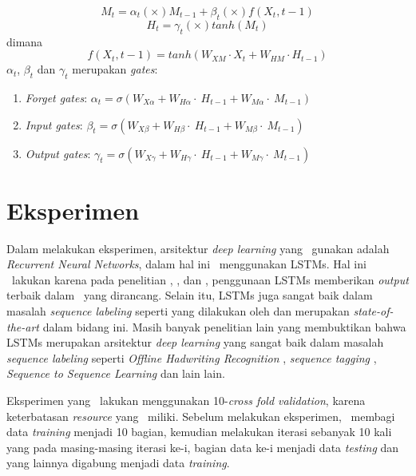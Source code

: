 \begin{enumerate}
	\begin{equation}\label{eq:mt3}
	M_{t}=\alpha_{t} (\times) M_{t-1} + \beta_{t} (\times) f(X_{t},{t-1})
	\end{equation}
	\begin{equation}\label{eq:ht3}
	H_{t}=\gamma_{t} (\times) tanh(M_{t})
	\end{equation}
	dimana
	\begin{equation}\label{eq:hf3}
	f(X_{t},{t-1})=tanh(W_{XM} \cdot X_{t} + W_{HM} \cdot H_{t-1})
	\end{equation}
	$ \alpha_{t} $, $ \beta_{t} $ dan $ \gamma_{t} $ merupakan \textit{gates}:
	\begin{enumerate}
	\item \textit{Forget gates}: $ \alpha_{t}=\sigma(W_{X\alpha}+W_{H\alpha}\cdot~H_{t-1}+W_{M\alpha}\cdot~M_{t-1}) $
	\item \textit{Input gates}: $ \beta_{t}=\sigma(W_{X\beta}+W_{H\beta}\cdot~H_{t-1}+W_{M\beta}\cdot~M_{t-1}) $
	\item \textit{Output gates}: $ \gamma_{t}=\sigma(W_{X\gamma}+W_{H\gamma}\cdot~H_{t-1}+W_{M\gamma}\cdot~M_{t-1}) $
	\end{enumerate}
		
\end{enumerate}
	
\section{Eksperimen}
Dalam melakukan eksperimen, arsitektur \textit{deep learning} yang \saya~gunakan adalah \textit{Recurrent Neural Networks}, dalam hal ini \saya~menggunakan LSTMs. Hal ini \saya~lakukan karena pada penelitian \cite{mujiono2016new}, \cite{jagannatha2016bidirectional}, \cite{limsopatham2016learning} dan \cite{almgren2016named}, penggunaan LSTMs memberikan \textit{output} terbaik dalam \mer~yang dirancang. Selain itu, LSTMs juga sangat baik dalam masalah \textit{sequence labeling} seperti yang dilakukan oleh \cite{graves2013speech} dan merupakan \textit{state-of-the-art} dalam bidang ini. Masih banyak penelitian lain yang membuktikan bahwa LSTMs merupakan arsitektur \textit{deep learning} yang sangat baik dalam masalah \textit{sequence labeling} seperti \textit{Offline Hadwriting Recognition} \citep{graves2009offline}, \textit{sequence tagging} \citep{huang2015bidirectional}, \textit{Sequence to Sequence Learning} \citep{NIPS2014_5346} dan lain lain.

Eksperimen yang \saya~lakukan menggunakan 10-\textit{cross fold validation}, karena keterbatasan \textit{resource} yang \saya~miliki. Sebelum melakukan eksperimen, \saya~membagi data \textit{training} menjadi 10 bagian, kemudian melakukan iterasi sebanyak 10 kali yang pada masing-masing iterasi ke-i, bagian data ke-i menjadi data \textit{testing} dan yang lainnya digabung menjadi data \textit{training}. 

